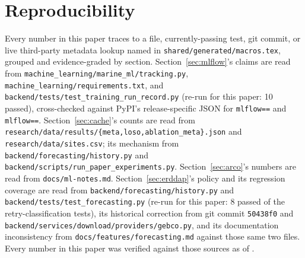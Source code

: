 \documentclass[runningheads]{llncs}
\begin{document}


\section*{Reproducibility}
Every number in this paper traces to a file, currently-passing test, git
commit, or live third-party metadata lookup named in
\texttt{shared/generated/macros.tex}, grouped and evidence-graded by
section. Section~\ref{sec:mlflow}'s claims are read from
\texttt{machine\_learning/marine\_ml/tracking.py},
\texttt{machine\_learning/requirements.txt}, and
\texttt{backend/tests/test\_training\_run\_record.py} (re-run for this
paper: 10 passed), cross-checked against PyPI's release-specific JSON for
\texttt{mlflow==\MlflowMatchedVersion{}} and \texttt{mlflow==\MlflowLatestVersion{}}.
Section~\ref{sec:cache}'s counts are read from
\texttt{research/data/results/\{meta,loso,ablation\_meta\}.json} and
\texttt{research/data/sites.csv}; its mechanism from
\texttt{backend/forecasting/history.py} and
\texttt{backend/scripts/run\_paper\_experiments.py}. Section~\ref{sec:arco}'s
numbers are read from \texttt{docs/ml-notes.md}. Section~\ref{sec:erddap}'s
policy and its regression coverage are read from
\texttt{backend/forecasting/history.py} and
\texttt{backend/tests/test\_forecasting.py} (re-run for this paper: 8
passed of the retry-classification tests), its historical correction from
git commit \texttt{50438f0} and
\texttt{backend/services/download/providers/gebco.py}, and its documentation
inconsistency from \texttt{docs/features/forecasting.md} against those same
two files. Every number in this paper was verified against those sources as
of \AsOf{}.



\end{document}
